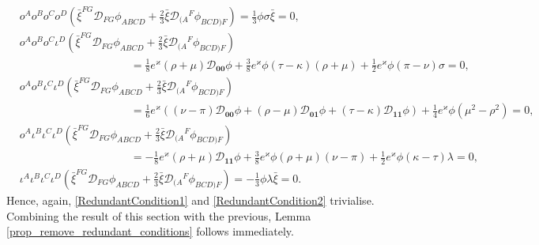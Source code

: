 \documentclass[10pt,a4paper]{article}
\theoremstyle{plain}
\begin{document}
\begin{align*}
& o^Ao^Bo^Co^D(\bar{\xi}^{FG}\mathcal{D}_{FG}\phi_{ABCD} + \tfrac{2}{3} \bar{\xi} \mathcal{D}_{(A}{}^{F}\phi_{BCD)F})  =\tfrac{1}{3} \phi \sigma  \bar{\xi} =0,\\
& o^Ao^Bo^C\iota^D(\bar{\xi}^{FG}\mathcal{D}_{FG}\phi_{ABCD} + \tfrac{2}{3} \bar{\xi} \mathcal{D}_{(A}{}^{F}\phi_{BCD)F}) \\
&\qquad\qquad\qquad\qquad\qquad = \tfrac{1}{8} e^{\varkappa} (\rho+\mu) \mathcal{D}_{\bm0\bm0}\phi + \tfrac{3}{8}e^{\varkappa}\phi  (\tau - \kappa)(\rho+\mu)  +  \tfrac{1}{2} e^{\varkappa}\phi(\pi-\nu) \sigma   = 0	,\\
& o^Ao^B\iota^C\iota^D(\bar{\xi}^{FG}\mathcal{D}_{FG}\phi_{ABCD} + \tfrac{2}{3} \bar{\xi} \mathcal{D}_{(A}{}^{F}\phi_{BCD)F})  \\
&\qquad\qquad\qquad\qquad\qquad=	\tfrac{1}{6} e^{\varkappa}\left((\nu-\pi)\mathcal{D}_{\bm0\bm0}\phi + (\rho-\mu)\mathcal{D}_{\bm0\bm1}\phi + (\tau-\kappa)\mathcal{D}_{\bm1\bm1}\phi \right)  + \tfrac{1}{4} e^{\varkappa} \phi(\mu^2-\rho^2) = 0,\\
& o^A\iota^B\iota^C\iota^D(\bar{\xi}^{FG}\mathcal{D}_{FG}\phi_{ABCD} + \tfrac{2}{3} \bar{\xi} \mathcal{D}_{(A}{}^{F}\phi_{BCD)F})  \\
& \qquad\qquad\qquad\qquad\qquad =	- \tfrac{1}{8} e^{\varkappa}  (\rho+\mu) \mathcal{D}_{\bm1\bm1}\phi  +  \tfrac{3}{8} e^{\varkappa} \phi(\rho+\mu) (\nu-\pi) + \tfrac{1}{2} e^{\varkappa}\phi (\kappa-\tau) \lambda    = 0,\\
& \iota^A\iota^B\iota^C\iota^D(\bar{\xi}^{FG}\mathcal{D}_{FG}\phi_{ABCD} + \tfrac{2}{3} \bar{\xi} \mathcal{D}_{(A}{}^{F}\phi_{BCD)F})  =	- \tfrac{1}{3}\phi \lambda \bar{\xi} = 0.
\end{align*}
Hence, again, \eqref{RedundantCondition1} and
\eqref{RedundantCondition2} trivialise. Combining the result of this
section with the previous, Lemma
\ref{prop_remove_redundant_conditions} follows immediately.


%
%
\end{document}
